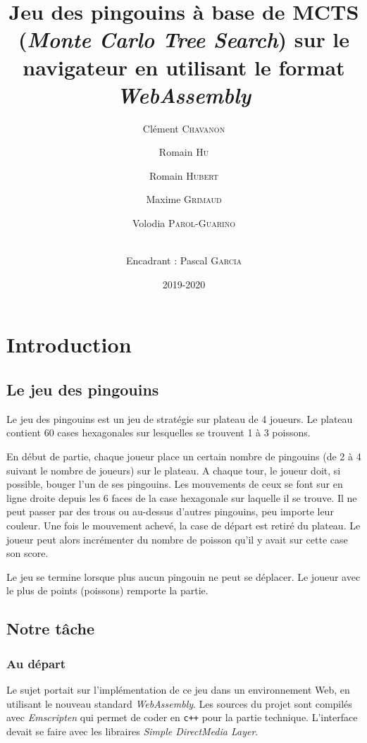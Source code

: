 \documentclass[a4paper,11pt]{article}
\title{\textbf{Jeu des pingouins à base de MCTS (\emph{Monte Carlo Tree
Search}) sur le navigateur en utilisant le format \emph{WebAssembly}}}
\author{Clément \textsc{Chavanon} \and Romain \textsc{Hu} \and Romain
\textsc{Hubert} \and Maxime \textsc{Grimaud} \and Volodia
\textsc{Parol-Guarino} \and 
 \\ Encadrant : Pascal \textsc{Garcia}}
\date{2019-2020}
\begin{document}
\maketitle
\begin{abstract}

\end{abstract}

\hypertarget{introduction}{%
\section*{Introduction}\label{introduction}}

\hypertarget{le-jeu-des-pingouins}{%
\subsection{Le jeu des pingouins}\label{le-jeu-des-pingouins}}

Le jeu des pingouins est un jeu de stratégie sur plateau de 4 joueurs.
Le plateau contient 60 cases hexagonales sur lesquelles se trouvent 1 à
3 poissons.

En début de partie, chaque joueur place un certain nombre de pingouins
(de 2 à 4 suivant le nombre de joueurs) sur le plateau. A chaque tour,
le joueur doit, si possible, bouger l'un de ses pingouins. Les
mouvements de ceux se font sur en ligne droite depuis les 6 faces de la
case hexagonale sur laquelle il se trouve. Il ne peut passer par des
trous ou au-dessus d'autres pingouins, peu importe leur couleur. Une
fois le mouvement achevé, la case de départ est retiré du plateau. Le
joueur peut alors incrémenter du nombre de poisson qu'il y avait sur
cette case son score.

Le jeu se termine lorsque plus aucun pingouin ne peut se déplacer. Le
joueur avec le plus de points (poissons) remporte la partie.

\hypertarget{notre-tuxe2che}{%
\subsection{Notre tâche}\label{notre-tuxe2che}}

\hypertarget{au-duxe9part}{%
\subsubsection{Au départ}\label{au-duxe9part}}

Le sujet portait sur l'implémentation de ce jeu dans un environnement
Web, en utilisant le nouveau standard \emph{WebAssembly}. Les sources du
projet sont compilés avec \emph{Emscripten} qui permet de coder en
\texttt{c++} pour la partie technique. L'interface devait se faire avec
les libraires \emph{Simple DirectMedia Layer}.
\end{document}
